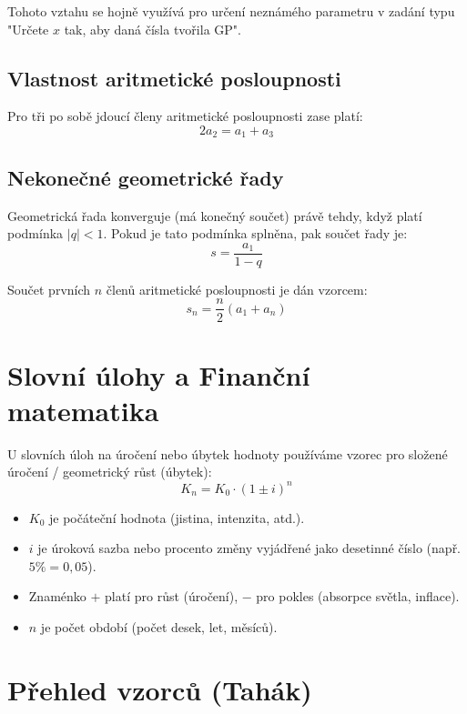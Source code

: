 \documentclass[12pt,a4paper]{article}
\begin{document}
Tohoto vztahu se hojně využívá pro určení neznámého parametru v zadání typu "Určete $x$ tak, aby daná čísla tvořila GP".

\subsection{Vlastnost aritmetické posloupnosti}
Pro tři po sobě jdoucí členy aritmetické posloupnosti zase platí:
\[ 2a_2 = a_1 + a_3 \]

\subsection{Nekonečné geometrické řady}
Geometrická řada konverguje (má konečný součet) právě tehdy, když platí podmínka $|q| < 1$. 
Pokud je tato podmínka splněna, pak součet řady je:
\[ s = \frac{a_1}{1 - q} \]

Součet prvních $n$ členů aritmetické posloupnosti je dán vzorcem:
\[ s_n = \frac{n}{2} (a_1 + a_n) \]

\section{Slovní úlohy a Finanční matematika}

U slovních úloh na úročení nebo úbytek hodnoty používáme vzorec pro složené úročení / geometrický růst (úbytek):
\[ K_n = K_0 \cdot (1 \pm i)^n \]
\begin{itemize}
    \item $K_0$ je počáteční hodnota (jistina, intenzita, atd.).
    \item $i$ je úroková sazba nebo procento změny vyjádřené jako desetinné číslo (např. $5\% = 0{,}05$).
    \item Znaménko $+$ platí pro růst (úročení), $-$ pro pokles (absorpce světla, inflace).
    \item $n$ je počet období (počet desek, let, měsíců).
\end{itemize}

\section{Přehled vzorců (Tahák)}
\end{document}

